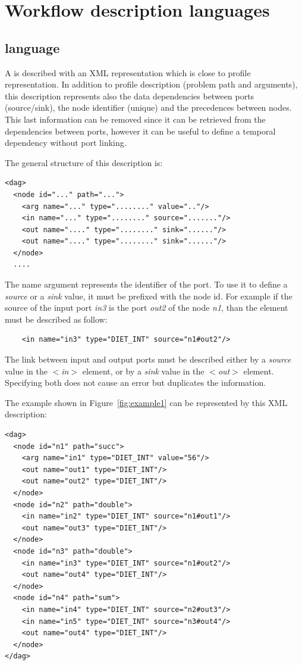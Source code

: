 \section{Workflow description languages}

\subsection{\madag language}
\label{sec:dag_desc}

A \DAG is described with an XML representation which is close to \diet profile
representation. In addition to profile description (problem path and
arguments), this description represents also the data dependencies between
ports (source/sink), the node identifier (unique) and the precedences between
nodes. This last information can be removed since it can be retrieved from the
dependencies between ports, however it can be useful to define a temporal
dependency without port linking.

The general structure of this description is:

\begin{verbatim}
<dag>
  <node id="..." path="...">
    <arg name="..." type="........" value=".."/>
    <in name="..." type="........" source="......."/>
    <out name="...." type="........" sink="......"/>
    <out name="...." type="........" sink="......"/>
  </node>
  ....
\end{verbatim}

The name argument represents the identifier of the port. To use it to define a
\textit{source} or a \textit{sink} value, it must be prefixed with the node
id. For example if the source of the input port \textit{in3} is the port
\textit{out2} of the node \textit{n1}, than the element must be described as
follow:

\begin{verbatim}
    <in name="in3" type="DIET_INT" source="n1#out2"/>
\end{verbatim}

The link between input and output ports must be described either by a
\textit{source} value in the \textit{$<$in$>$} element, or by a \textit{sink} value
in the \textit{$<$out$>$} element. Specifying both does not cause an error but
duplicates the information.

The example shown in Figure~\ref{fig:example1} can be represented by this XML
description:

\begin{verbatim}
<dag>
  <node id="n1" path="succ">
    <arg name="in1" type="DIET_INT" value="56"/>
    <out name="out1" type="DIET_INT"/>
    <out name="out2" type="DIET_INT"/>
  </node>
  <node id="n2" path="double">
    <in name="in2" type="DIET_INT" source="n1#out1"/>
    <out name="out3" type="DIET_INT"/>
  </node>
  <node id="n3" path="double">
    <in name="in3" type="DIET_INT" source="n1#out2"/>
    <out name="out4" type="DIET_INT"/>
  </node>
  <node id="n4" path="sum">
    <in name="in4" type="DIET_INT" source="n2#out3"/>
    <in name="in5" type="DIET_INT" source="n3#out4"/>
    <out name="out4" type="DIET_INT"/>
  </node>
</dag>
\end{verbatim}

